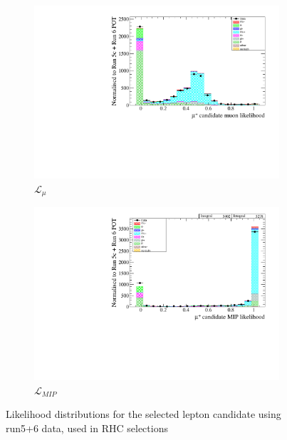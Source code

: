 \begin{figure}[h]
	\begin{subfigure}[t]{0.49\textwidth}
		\includegraphics[width=\textwidth]{figures/numu/Cuts/numubar/selmu_likemu_particle}
		\caption{$\mathcal{L}_\mu$}
	\end{subfigure}
	\begin{subfigure}[t]{0.49\textwidth}
		\includegraphics[width=\textwidth]{figures/numu/Cuts/numubar/selmu_likemip_particle}
		\caption{$\mathcal{L}_{MIP}$}
	\end{subfigure}
	\caption{Likelihood distributions for the selected lepton candidate using run5+6 \numubar data, used in \numubar RHC selections}
	\label{fig:numubar_likelihood_sel}
\end{figure}

